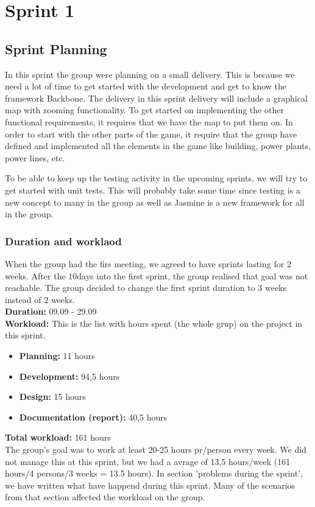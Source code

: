 \section{Sprint 1}

\subsection{Sprint Planning}
	In this sprint the group were planning on a small delivery. This is because we need a lot of time to get started with the development and get to know the framework Backbone. The delivery in this sprint delivery will include a graphical map with zooming functionality. To get started on implementing the other functional requirements, it requires that we have the map to put them on. 
	In order to start with the other parts of the game, it require that the group have defined and implemented all the elements in the game like building, power plants, power lines, etc.

	To be able to keep up the testing activity in the upcoming sprints, we will try to get started with unit tests. This will probably take some time since testing is a new concept to many in the group as well as Jasmine is a new framework for all in the group. 

\subsubsection{Duration and worklaod}
	When the group had the firs meeting, we agreed to have sprints lasting for 2 weeks.
	After the 10days into the first sprint, the group realised that goal was not reachable.
	The group decided to change the first sprint duration to 3 weeks instead of 2 weeks. \\
	{\bf Duration:} 09.09 - 29.09 \\
	{\bf Workload:} This is the list with hours spent (the whole grup) on the project in this sprint.
	\begin{itemize}
		\item {\bf Planning:} 11 hours
		\item {\bf Development:} 94,5 hours
		\item {\bf Design:} 15 hours
		\item {\bf Documentation (report):} 40,5 hours
	\end{itemize}
	{\bf Total workload: } 161 hours \\
	The group's goal was to work at least 20-25 hours pr/person every week. We did not manage this at this sprint, but we had a avrage of 13,5 hours/week (161 hours/4 persons/3 weeks = 13.5 hours). 
	In section 'problems during the sprint', we have written what have happend during this sprint.
	Many of the scenarios from that section affected the workload on the group. 

